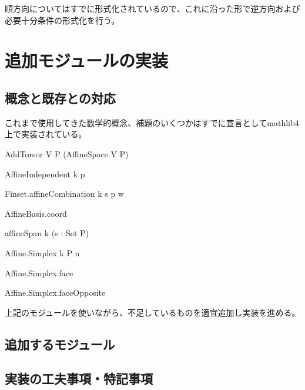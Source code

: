 \documentclass[a4paper,12pt]{bxjsbook}
\newlength{\customindent}
\newenvironment{body}{
  \par
  \begingroup
  \setlength{\leftskip}{\customindent}
  \setlength{\rightskip}{0pt}
  \setlength{\parindent}{1em}
  \setlength{\displayindent}{\customindent}
  \setlength{\displaywidth}{\dimexpr\linewidth-\customindent\relax}
}{
  \par
  \endgroup
}
\theoremstyle{theorem}
\begin{document}
\begin{body}
    \begin{body}
        \indent 順方向についてはすでに形式化されているので、これに沿った形で逆方向および必要十分条件の形式化を行う。
    \end{body}

    \section{追加モジュールの実装}
    \subsection{概念と既存との対応}
    \begin{body}
        \indent これまで使用してきた数学的概念、補題のいくつかはすでに宣言としてmathlib4上で実装されている。
        \begin{bodyitemize}
            \item[アフィン空間] AddTorsor V P (AffineSpace V P)
            \item[アフィン独立] AffineIndependent k p
            \item[アフィン結合] Finset.affineCombination k s p w
            \item[重心座標] AffineBasis.coord
            \item[アフィン包] affineSpan k (s : Set P)
            \item[凸包] %
            \item[単体] Affine.Simplex k P n
            \item[面] Affine.Simplex.face
            \item[対向面] Affine.Simplex.faceOpposite
        \end{bodyitemize}

        \indent 上記のモジュールを使いながら、不足しているものを適宜追加し実装を進める。
    \end{body}

    \subsection{追加するモジュール}

    \subsection{実装の工夫事項・特記事項}
    \begin{bodydescription}
        \item %
    \end{bodydescription}


\end{body}
\end{document}

